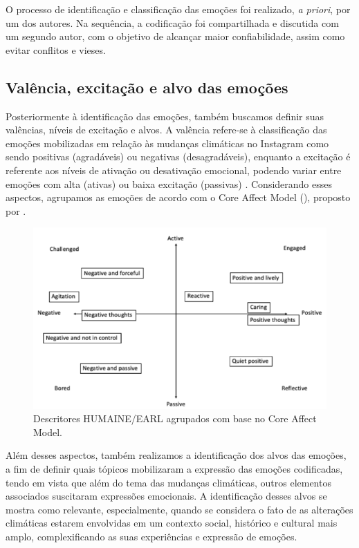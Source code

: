 \documentclass[portuguese]{textolivre}
\begin{document}
O processo de identificação e classificação das emoções foi realizado, \textit{a priori}, por um dos autores. Na sequência, a codificação foi compartilhada e discutida com um segundo autor, com o objetivo de alcançar maior confiabilidade, assim como evitar conflitos e vieses.

\subsection{Valência, excitação e alvo das emoções}\label{sec-modelo}
Posteriormente à identificação das emoções, também buscamos definir suas valências, níveis de excitação e alvos. A valência refere-se à classificação das emoções mobilizadas em relação às mudanças climáticas no Instagram como sendo positivas (agradáveis) ou negativas (desagradáveis), enquanto a excitação é referente aos níveis de ativação ou desativação emocional, podendo variar entre emoções com alta (ativas) ou baixa excitação (passivas) \cite{russell2003core}. Considerando esses aspectos, agrupamos as emoções de acordo com o Core Affect Model (), proposto por \textcite{russell2003core}.

\begin{figure}[h!]
    \centering
    \begin{minipage}{0.8\linewidth}
    \includegraphics[width=\linewidth]{Fig1.png}
    \caption{Descritores HUMAINE/EARL agrupados com base no Core Affect Model.}
    \label{fig1}
    \end{minipage}
\end{figure}

Além desses aspectos, também realizamos a identificação dos alvos das emoções, a fim de definir quais tópicos mobilizaram a expressão das emoções codificadas, tendo em vista que além do tema das mudanças climáticas, outros elementos associados suscitaram expressões emocionais. A identificação desses alvos se mostra como relevante, especialmente, quando se considera o fato de as alterações climáticas estarem envolvidas em um contexto social, histórico e cultural mais amplo, complexificando as suas experiências e expressão de emoções.
\end{document}
